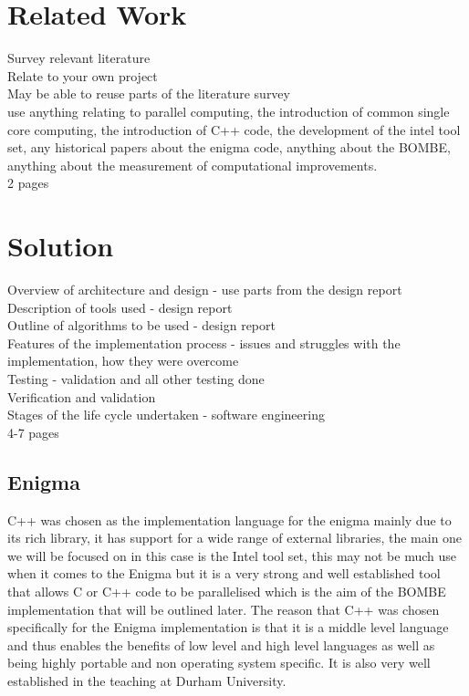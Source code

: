 \documentclass[12pt,a4paper]{article}
\begin{document}
\section{Related Work}

Survey relevant literature\\
Relate to your own project\\
May be able to reuse parts of the literature survey\\
use anything relating to parallel computing, the introduction of common single core computing, the introduction of C++ code, the development of the intel tool set, any historical papers about the enigma code, anything about the BOMBE, anything about the measurement of computational improvements.\\
2 pages

\section{Solution}

Overview of architecture and design - use parts from the design report\\
Description of tools used - design report\\
Outline of algorithms to be used - design report\\
Features of the implementation process - issues and struggles with the implementation, how they were overcome\\
Testing - validation and all other testing done\\
Verification and validation\\
Stages of the life cycle undertaken - software engineering\\
4-7 pages\\

\subsection{Enigma}

C++ was chosen as the implementation language for the enigma mainly due to its rich library, it has support for a wide range of external libraries, the main one we will be focused on in this case is the Intel tool set, this may not be much use when it comes to the Enigma but it is a very strong and well established tool that allows C or C++ code to be parallelised which is the aim of the BOMBE implementation that will be outlined later. The reason that C++ was chosen specifically for the Enigma implementation is that it is a middle level language and thus enables the benefits of low level and high level languages as well as being highly portable and non operating system specific. It is also very well established in the teaching at Durham University.\\
\end{document}
